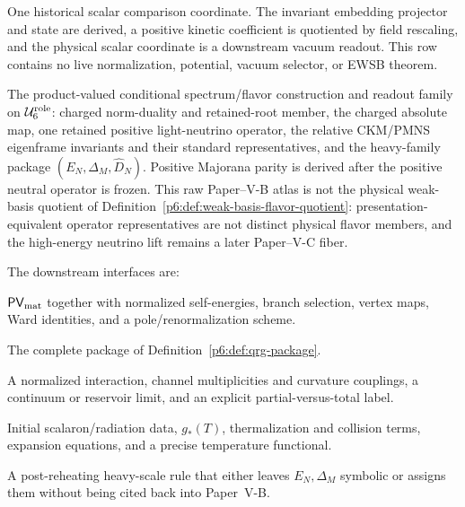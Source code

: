 \documentclass[12pt,a4paper]{article}
\newcommand{\Urole}{\mathcal U_6^{\rm role}}
\begin{document}
\begin{definition}
\begin{description}[style=nextline,leftmargin=2.8em]
\item[\(\mathsf H_{\rm comp}\)]
One historical scalar comparison coordinate.  The invariant embedding
projector and state are derived, a positive kinetic coefficient is quotiented
by field rescaling, and the physical scalar coordinate is a downstream vacuum
readout.  This row contains no live normalization, potential, vacuum selector,
or EWSB theorem.

\item[\(\mathsf F\)]
The product-valued conditional spectrum/flavor construction and readout
family on \(\Urole\): charged norm-duality and retained-root member, the charged absolute
map, one retained positive light-neutrino operator, the relative CKM/PMNS
eigenframe invariants and their standard representatives, and the heavy-family
package \((E_N,\Delta_M,\widehat D_N)\).  Positive Majorana parity is derived
after the positive neutral operator is frozen.  This raw Paper--V-B atlas is
not the physical weak-basis quotient of
Definition~\ref{p6:def:weak-basis-flavor-quotient}: presentation-equivalent
operator representatives are not distinct physical flavor members, and the
high-energy neutrino lift remains a later Paper--V-C fiber.
\end{description}
\end{definition}

\begin{definition}
\label{p6:def:observable-package}
The downstream interfaces are:
\begin{description}[style=nextline,leftmargin=2.8em]
\item[\(\mathsf{PV}\)]
\(\mathsf{PV}_{\rm mat}\) together with normalized self-energies, branch
selection, vertex maps, Ward identities, and a pole/renormalization scheme.

\item[\(\mathsf{QRG}\)]
The complete package of Definition~\ref{p6:def:qrg-package}.

\item[\(\mathsf{DEC}\)]
A normalized interaction, channel multiplicities and curvature couplings,
a continuum or reservoir limit, and an explicit partial-versus-total label.

\item[\(\mathsf{FLRW}\)]
Initial scalaron/radiation data, \(g_*(T)\), thermalization and collision
terms, expansion equations, and a precise temperature functional.

\item[\(\mathsf N_{\rm th}\)]
A post-reheating heavy-scale rule that either leaves
\(E_N,\Delta_M\) symbolic or assigns them without being cited back into
Paper~V-B.
\end{description}
\end{definition}
\end{document}
